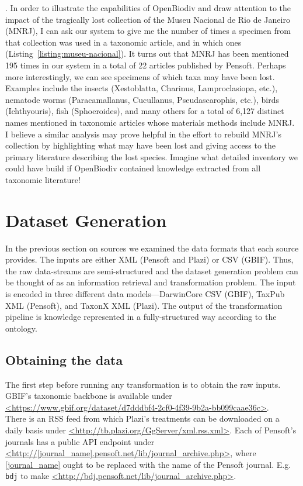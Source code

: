 . In order to illustrate the capabilities of OpenBiodiv and draw attention to the impact of the tragically lost collection of the Museu Nacional de Rio de Janeiro (MNRJ), I can ask our system to give me the number of times a specimen from that collection was used in a taxonomic article, and in which ones (Listing~\ref{listing:museu-nacional}). It turns out that MNRJ has been mentioned 195 times in our system in a total of 22 articles published by Pensoft. Perhaps more interestingly, we can see specimens of which taxa may have been lost. Examples include the insects (Xestoblatta, Charinus, Lamproclasiopa, etc.), nematode worms (Paracamallanus, Cucullanus, Pseudascarophis, etc.), birds (Ichthyouris), fish (Sphoeroides), and many others for a total of 6,127 distinct names mentioned in taxonomic articles whose materials methods include MNRJ. I believe a similar analysis may prove helpful in the effort to rebuild MNRJ’s collection by highlighting what may have been lost and giving access to the primary literature describing the lost species. Imagine what detailed inventory we could have build if OpenBiodiv contained knowledge extracted from all taxonomic literature!





\section{Dataset Generation}

In the previous section on sources we examined the data formats that each source provides. The inputs are either XML (Pensoft and Plazi) or CSV (GBIF). Thus, the raw data-streams are semi-structured and the dataset generation problem can be thought of as an information retrieval and transformation problem. The input is encoded in three different data models---DarwinCore CSV (GBIF), TaxPub XML (Pensoft), and TaxonX XML (Plazi). The output of the transformation pipeline is  knowledge represented in a fully-structured way according to the ontology.

\subsection{Obtaining the data}

The first step before running any transformation is to obtain the raw inputs. GBIF's taxonomic backbone is available under\\ 
\url{<https://www.gbif.org/dataset/d7dddbf4-2cf0-4f39-9b2a-bb099caae36c>}.\\There is an RSS feed from which Plazi's treatments can be downloaded on a daily basis under \url{<http://tb.plazi.org/GgServer/xml.rss.xml>}. Each of Pensoft's journals has a public API endpoint under \url{<http://[journal_name].pensoft.net/lib/journal_archive.php>}, where \url{[journal_name]} ought to be replaced with the name of the Pensoft journal. E.g. {\tt bdj} to make \url{<http://bdj.pensoft.net/lib/journal_archive.php>}.



